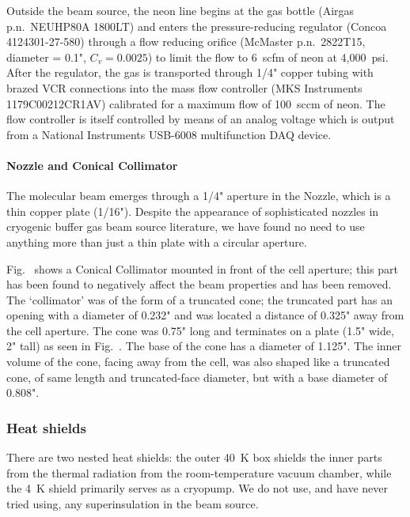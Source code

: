 Outside the beam source, the neon line begins at the gas bottle (Airgas p.n.\
NEUHP80A 1800LT) and enters the pressure-reducing regulator (Concoa
4124301-27-580) through a flow reducing orifice (McMaster p.n.\ 2822T15,
diameter = 0.1", $C_v=0.0025$) to limit the flow to 6~scfm of neon at 4,000~psi.
After the regulator, the gas is transported through 1/4" copper tubing with
brazed VCR connections into the mass flow controller (MKS Instruments
1179C00212CR1AV) calibrated for a maximum flow of 100~sccm of neon. The flow
controller is itself controlled by means of an analog voltage which is output
from a National Instruments USB-6008 multifunction DAQ device.

\paragraph{Nozzle and Conical Collimator}

The molecular beam emerges through a 1/4" aperture in the Nozzle, which is a
thin copper plate (1/16"). Despite the appearance of sophisticated nozzles in
cryogenic buffer gas beam source literature,
\cite{xiao2019shaped,takahashi2021simulation} we have found no need to use
anything more than just a thin plate with a circular aperture.

Fig.~ shows a Conical Collimator mounted in front of the cell
aperture; this part has been found to negatively affect the beam properties and
has been removed. The `collimator' was of the form of a truncated cone; the truncated
part has an opening with a diameter of 0.232" and was located a distance of
0.325" away from the cell aperture. The cone was 0.75" long and terminates on a
plate (1.5" wide, 2" tall) as seen in Fig.~\fref{cell_assembly}. The base of the
cone has a diameter of 1.125". The inner volume of the cone, facing away from
the cell, was also shaped like a truncated cone, of same length and
truncated-face diameter, but with a base diameter of 0.808".

\subsubsection{Heat shields}

There are two nested heat shields: the outer 40~K box shields the inner parts
from the thermal radiation from the room-temperature vacuum chamber, while the
4~K shield primarily serves as a cryopump. We do not use, and have never tried
using, any superinsulation in the beam source.

